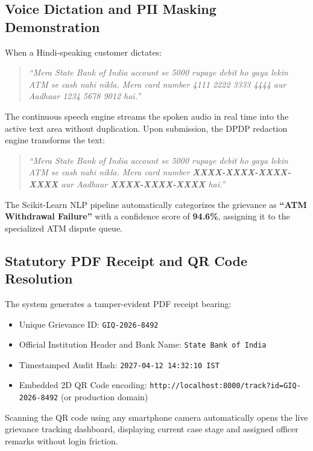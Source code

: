\subsection{Voice Dictation and PII Masking Demonstration}
When a Hindi-speaking customer dictates:
\begin{quote}
\textit{``Mera State Bank of India account se 5000 rupaye debit ho gaya lekin ATM se cash nahi nikla. Mera card number 4111 2222 3333 4444 aur Aadhaar 1234 5678 9012 hai.''}
\end{quote}
The continuous speech engine streams the spoken audio in real time into the active text area without duplication. Upon submission, the DPDP redaction engine transforms the text:
\begin{quote}
\textit{``Mera State Bank of India account se 5000 rupaye debit ho gaya lekin ATM se cash nahi nikla. Mera card number \textbf{XXXX-XXXX-XXXX-XXXX} aur Aadhaar \textbf{XXXX-XXXX-XXXX} hai.''}
\end{quote}
The Scikit-Learn NLP pipeline automatically categorizes the grievance as \textbf{``ATM Withdrawal Failure''} with a confidence score of \textbf{94.6\%}, assigning it to the specialized ATM dispute queue.

\subsection{Statutory PDF Receipt and QR Code Resolution}
The system generates a tamper-evident PDF receipt bearing:
\begin{itemize}
    \item Unique Grievance ID: \texttt{GIQ-2026-8492}
    \item Official Institution Header and Bank Name: \texttt{State Bank of India}
    \item Timestamped Audit Hash: \texttt{2027-04-12 14:32:10 IST}
    \item Embedded 2D QR Code encoding: \texttt{http://localhost:8000/track?id=GIQ-2026-8492} (or production domain)
\end{itemize}
Scanning the QR code using any smartphone camera automatically opens the live grievance tracking dashboard, displaying current case stage and assigned officer remarks without login friction.

